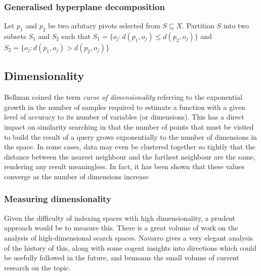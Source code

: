 \subsubsection{Generalised hyperplane decomposition}
%
\begin{mydef}
Let $p_1$ and $p_2$ be two arbitary pivots selected from $S \subseteq X$.  Partition $S$ into two subsets $S_1$ and $S_2$ such that $S_1 = \{o_j : d(p_1, o_j) \leq d(p_2, o_j)\}$ and $S_2 = \{o_j : d(p_1, o_j) > d(p_2, o_j)\}$
\end{mydef}
\subsection{Dimensionality}
Bellman coined the term \textit{curse of dimensionality} referring to the exponential growth in the number of samples required to estimate a function with a given level of accuracy to its number of variables (or dimensions)\cite{Bellman:2003}.  This has a direct impact on similarity searching in that the number of points that must be visited to build the result of a query grows exponentially to the number of dimensions in the space.  In some cases, data may even be clustered together so tightly that the distance between the nearest neighbour and the farthest neighbour are the same, rendering any result meaningless.  In fact, it has been shown that these values converge as the number of dimensions increase%
%
\subsubsection{Measuring dimensionality}
Given the difficulty of indexing spaces with high dimensionality, a prudent approach would be to measure this. 
%
There is a great volume of work on the analysis of high-dimensional search spaces. Navarro gives a very elegant analysis of the history of this, along with some cogent insights into directions which could be usefully followed in the future, and bemoans the small volume of current research on the topic. 

